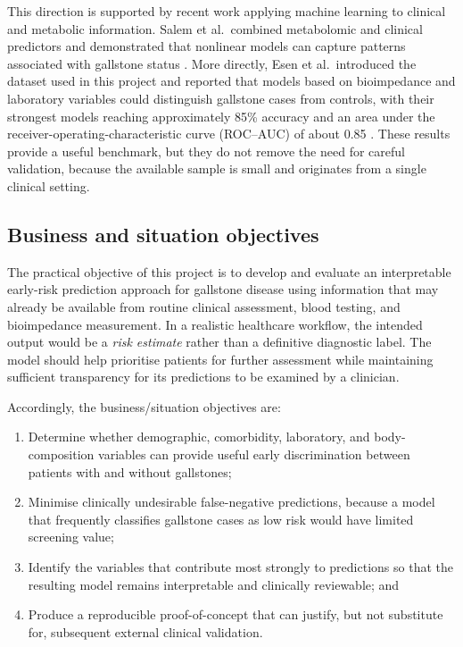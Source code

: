 This direction is supported by recent work applying machine learning to clinical and metabolic information. Salem et al.\ combined metabolomic and clinical predictors and demonstrated that nonlinear models can capture patterns associated with gallstone status \cite{salem2023ml}. More directly, Esen et al.\ introduced the dataset used in this project and reported that models based on bioimpedance and laboratory variables could distinguish gallstone cases from controls, with their strongest models reaching approximately 85\% accuracy and an area under the receiver-operating-characteristic curve (ROC--AUC) of about 0.85 \cite{esen2024early}. These results provide a useful benchmark, but they do not remove the need for careful validation, because the available sample is small and originates from a single clinical setting.

\subsection{Business and situation objectives}
\label{subsec:business-objectives}

The practical objective of this project is to develop and evaluate an interpretable early-risk prediction approach for gallstone disease using information that may already be available from routine clinical assessment, blood testing, and bioimpedance measurement. In a realistic healthcare workflow, the intended output would be a \emph{risk estimate} rather than a definitive diagnostic label. The model should help prioritise patients for further assessment while maintaining sufficient transparency for its predictions to be examined by a clinician.

Accordingly, the business/situation objectives are:

\begin{enumerate}
    \item Determine whether demographic, comorbidity, laboratory, and body-composition variables can provide useful early discrimination between patients with and without gallstones;
    \item Minimise clinically undesirable false-negative predictions, because a model that frequently classifies gallstone cases as low risk would have limited screening value;
    \item Identify the variables that contribute most strongly to predictions so that the resulting model remains interpretable and clinically reviewable; and
    \item Produce a reproducible proof-of-concept that can justify, but not substitute for, subsequent external clinical validation.
\end{enumerate}

